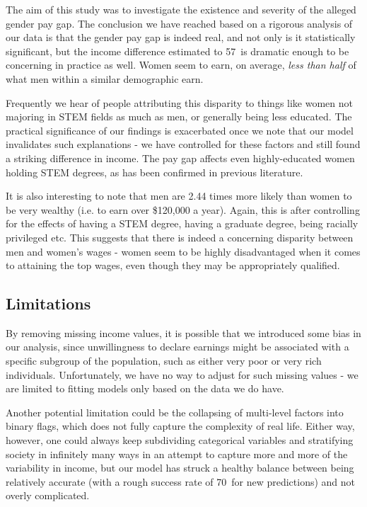 \documentclass{article}
\newcommand*\pct{\scalebox{.85}{\%}}
\begin{document}
The aim of this study was to investigate the existence and severity of the alleged gender pay gap. The conclusion we have reached based on a rigorous analysis of our data is that the gender pay gap is indeed real, and not only is it statistically significant, but the income difference estimated to 57\pct \, is dramatic enough to be concerning in practice as well. Women seem to earn, on average, \textit{less than half} of what men within a similar demographic earn.

Frequently we hear of people attributing this disparity to things like women not majoring in STEM fields as much as men, or generally being less educated. The practical significance of our findings is exacerbated once we note that our model invalidates such explanations - we have controlled for these factors and still found a striking difference in income. The pay gap affects even highly-educated women holding STEM degrees, as has been confirmed in previous literature. \cite{epi}

It is also interesting to note that men are 2.44 times more likely than women to be very wealthy (i.e. to earn over \$120,000 a year). Again, this is after controlling for the effects of having a STEM degree, having a graduate degree, being racially privileged etc. This suggests that there is indeed a concerning disparity between men and women's wages - women seem to be highly disadvantaged when it comes to attaining the top wages, even though they may be appropriately qualified. 

\subsection{Limitations}

By removing missing income values, it is possible that we introduced some bias in our analysis, since unwillingness to declare earnings might be associated with a specific subgroup of the population, such as either very poor or very rich individuals. Unfortunately, we have no way to adjust for such missing values - we are limited to fitting models only based on the data we do have. 

Another potential limitation could be the collapsing of multi-level factors into binary flags, which does not fully capture the complexity of real life. Either way, however, one could always keep subdividing categorical variables and stratifying society in infinitely many ways in an attempt to capture more and more of the variability in income, but our model has struck a healthy balance between being relatively accurate (with a rough success rate of 70\pct \, for new predictions) and not overly complicated.
\end{document}
